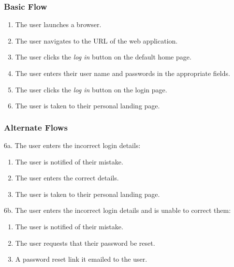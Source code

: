 \documentclass[12pt,onecolumn]{article}
\begin{document}
		\subsubsection{Basic Flow}

		\begin{enumerate}
			\item The user launches a browser.

			\item The user navigates to the URL of the web application.

			\item The user clicks the \emph{log in} button on the default home page.

			\item The user enters their user name and passwords in the appropriate fields.

			\item The user clicks the \emph{log in} button on the login page.

			\item The user is taken to their personal landing page.

		\end{enumerate}

		\subsubsection{Alternate Flows}

		6a. The user enters the incorrect login details:

		\begin{enumerate}
			\item The user is notified of their mistake.

			\item The user enters the correct details.

			\item The user is taken to their personal landing page.
		\end{enumerate}
		
		6b. The user enters the incorrect login details and is unable to correct them:

		\begin{enumerate}
			\item The user is notified of their mistake.

			\item The user requests that their password be reset.

			\item A password reset link it emailed to the user.
		\end{enumerate}
\end{document}
